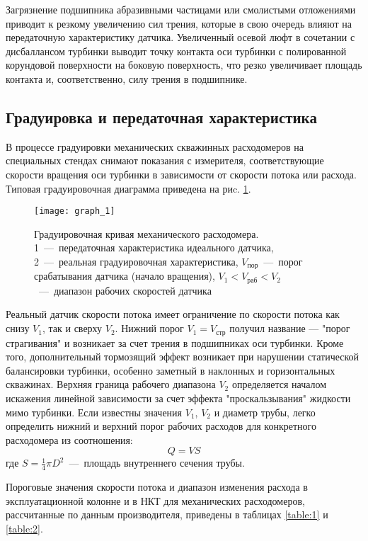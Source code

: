 Загрязнение подшипника абразивными частицами или
смолистыми отложениями приводит к резкому увеличению сил трения,
которые в свою очередь влияют на передаточную характеристику
датчика. Увеличенный осевой люфт в сочетании с дисбаллансом
турбинки выводит точку контакта оси турбинки с полированной
корундовой поверхности на боковую поверхность, что резко увеличивает
площадь контакта и, соответственно, силу трения в подшипнике.


\subsection{Градуировка и передаточная характеристика}

В процессе градуировки механических скважинных
расходомеров на специальных стендах снимают показания с измерителя,
соответствующие скорости вращения оси турбинки в зависимости от
скорости потока или расхода. Типовая градуировочная диаграмма
приведена на риc. \ref{fig:graph_1}.

\begin{figure}[h]
\centering
\texttt{[image: graph\_1]}
\caption{
Градуировочная кривая механического расходомера. \\
1~---~передаточная характеристика идеального датчика,
2~---~реальная градуировочная характеристика,
$V_\mathrm{пор}$~---~порог срабатывания датчика (начало вращения),
$V_1 < V_\mathrm{раб} < V_2$~---~диапазон рабочих скоростей датчика
}
\label{fig:graph_1}
\end{figure}

Реальный датчик скорости потока имеет ограничение по скорости
потока как снизу $V_1$, так и сверху $V_2$. Нижний порог $V_1 = V_\mathrm{стр}$ получил
название --- "порог страгивания" и возникает за счет трения в
подшипниках оси турбинки. Кроме того, дополнительный тормозящий
эффект возникает при нарушении статической балансировки турбинки,
особенно заметный в наклонных и горизонтальных скважинах. Верхняя
граница рабочего диапазона $V_2$ определяется началом искажения
линейной зависимости за счет эффекта "проскальзывания" жидкости
мимо турбинки. Если известны значения $V_1$, $V_2$ и диаметр трубы,
легко определить нижний и верхний порог рабочих расходов для
конкретного расходомера из соотношения:
$$Q = VS$$
где $S = \frac 1 4 \pi D^2$~---~площадь внутреннего сечения трубы.

Пороговые значения скорости потока и диапазон изменения расхода
в эксплуатационной колонне и в НКТ для механических расходомеров,
рассчитанные по данным производителя, приведены в таблицах \ref{table:1} и \ref{table:2}.

